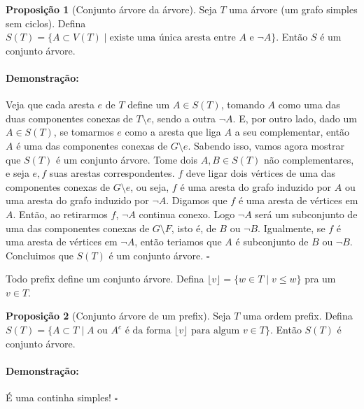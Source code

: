 \documentclass[11pt]{article}
\newcommand{\pulinho}{\vspace{.5cm}}
\theoremstyle{definition}
\theoremstyle{definition}
\theoremstyle{definition}
\newtheorem{prop}{Proposição}
\newenvironment{proposicao}{
\definecolor{shadecolor}{HTML}{FFDBDF}
\begin{shaded}
\begin{prop}
}
{
\end{prop}
\end{shaded}
}
\theoremstyle{definition}
\theoremstyle{definition}
\theoremstyle{definition}
\theoremstyle{definition}
\theoremstyle{definition}
\theoremstyle{definition}
\theoremstyle{definition}
\theoremstyle{definition}
\theoremstyle{definition}
\newenvironment{prova}{\paragraph{Demonstração:}}{\hfill$\square$ 
\pulinho
}
\theoremstyle{definition}
\theoremstyle{definition}
\begin{document}
\begin{proposicao}[Conjunto árvore da árvore]
  Seja $T$ uma árvore (um grafo simples sem ciclos). Defina $S(T) = \{A \subset V(T) \mid \text{existe uma única aresta entre } A \text{ e } \lnot A\}$. Então $S$ é um conjunto árvore.
\end{proposicao}
\begin{prova}
Veja que cada aresta $e$ de $T$ define um $A \in S(T)$, tomando $A$ como uma das duas componentes conexas de $T \setminus e$, sendo a outra $\lnot A$. E, por outro lado, dado um $A \in S(T)$, se tomarmos $e$ como a aresta que liga $A$ a seu complementar, então $A$ é uma das componentes conexas de $G \setminus e$. Sabendo isso, vamos agora mostrar que $S(T)$ é um conjunto árvore. Tome dois $A,B \in S(T)$ não complementares, e seja $e,f$ suas arestas correspondentes. $f$ deve ligar dois vértices de uma das componentes conexas de $G\setminus e$, ou seja, $f$ é uma aresta do grafo induzido por $A$ ou uma aresta do grafo induzido por $\lnot A$. Digamos que $f$ é uma aresta de vértices em $A$. Então, ao retirarmos $f$, $\lnot A$ continua conexo. Logo $\lnot A$ será um subconjunto de uma das componentes conexas de $G \setminus F$, isto é, de $B$ ou $\lnot B$. Igualmente, se $f$ é uma aresta de vértices em $\lnot A$, então teriamos que $A$ é subconjunto de $B$ ou $\lnot B$. Concluimos que $S(T)$ é um conjunto árvore.
\end{prova}

Todo prefix define um conjunto árvore. 
Defina $\lfloor v \rfloor = \{w \in T \mid v \leq w\}$ pra um $v \in T$.

\begin{proposicao}[Conjunto árvore de um prefix]
  Seja $T$ uma ordem prefix. Defina $S(T) = \{A \subset T \mid A \text{ ou } A^c \text{ é da forma } \lfloor v \rfloor \text{ para algum } v \in T \}$. Então $S(T)$ é conjunto árvore.
\end{proposicao}
\begin{prova}
É uma continha simples!
\end{prova}
\end{document}
